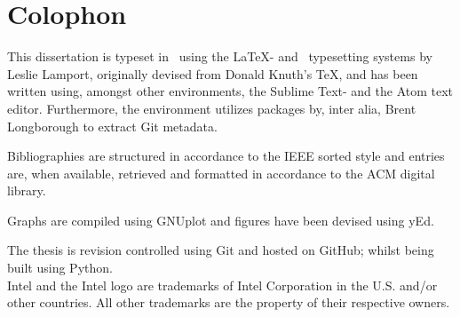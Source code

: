 
\chapter*{Colophon}
\label{cha:colophon}
This dissertation is typeset in \fonttostring\ using the \LaTeX - and \BibTeX\ typesetting systems by Leslie Lamport, originally devised from Donald Knuth's \TeX , and has been written using, amongst other environments, the Sublime Text- and the Atom text editor.
Furthermore, the environment utilizes packages by, inter alia, Brent Longborough to extract Git metadata.

Bibliographies are structured in accordance to the IEEE sorted style and entries are, when available, retrieved and formatted in accordance to the ACM digital library.

Graphs are compiled using GNUplot and figures have been devised using yEd.

The thesis is revision controlled using Git and hosted on GitHub; whilst being built using Python.\\

\noindent
Intel and the Intel logo are trademarks of Intel Corporation in the U.S. and/or other countries.
All other trademarks are the property of their respective owners.







